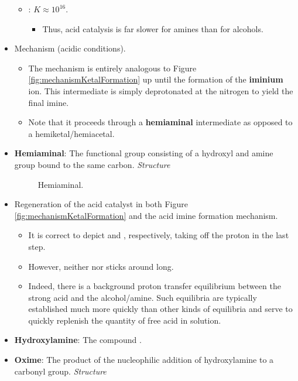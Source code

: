 \documentclass[../notes.tex]{subfiles}
\begin{document}
\begin{itemize}
\begin{itemize}
        \item {}: $K\approx 10^{16}$.
        \begin{itemize}
            \item Thus, acid catalysis is far slower for amines than for alcohols.
        \end{itemize}
    \end{itemize}
    \item Mechanism (acidic conditions).
    \begin{itemize}
        \item The mechanism is entirely analogous to Figure \ref{fig:mechanismKetalFormation} up until the formation of the \textbf{iminium} ion. This intermediate is simply deprotonated at the nitrogen to yield the final imine.
        \item Note that it proceeds through a \textbf{hemiaminal} intermediate as opposed to a hemiketal/hemiacetal.
    \end{itemize}
    \item \textbf{Hemiaminal}: The functional group consisting of a hydroxyl and amine group bound to the same carbon. \emph{Structure}
    \begin{figure}[h!]
        \centering
        \footnotesize
        \caption{Hemiaminal.}
        \label{fig:hemiaminal}
    \end{figure}
    \item Regeneration of the acid catalyst in both Figure \ref{fig:mechanismKetalFormation} and the acid imine formation mechanism.
    \begin{itemize}
        \item It is correct to depict  and , respectively, taking off the proton in the last step.
        \item However, neither  nor  sticks around long.
        \item Indeed, there is a background proton transfer equilibrium between the strong acid and the alcohol/amine. Such equilibria are typically established much more quickly than other kinds of equilibria and serve to quickly replenish the quantity of free acid in solution.
    \end{itemize}
    \item \textbf{Hydroxylamine}: The compound .
    \item \textbf{Oxime}: The product of the nucleophilic addition of hydroxylamine to a carbonyl group. \emph{Structure}

\end{itemize}
\end{document}
